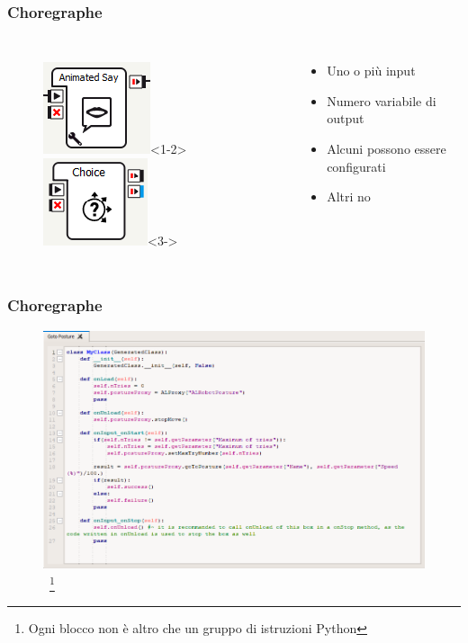 \documentclass[aspectratio=169]{beamer}
\begin{document}
\begin{frame}
\frametitle{Choregraphe}
\begin{columns}
		\begin{figure}[ht]
		\begin{center}
		\includegraphics[width=.4\textwidth]{wrench}<1-2>
		\includegraphics[width=.4\textwidth]{choice}<3->
		\end{center}
		\end{figure}
		\begin{itemize}
			\item<1-> Uno o più input
			\item<1-> Numero variabile di output
			\item<2-> Alcuni possono essere configurati
			\item<3-> Altri no
		\end{itemize}
\end{columns}
\end{frame}

\begin{frame}
\frametitle{Choregraphe}
\begin{figure}[ht]
\begin{center}
\includegraphics[width=.6\textwidth]{script}
~\footnote{Ogni blocco non è altro che un gruppo di istruzioni Python}
\end{center}
\end{figure}
\end{frame}
\end{document}
